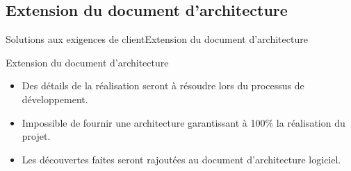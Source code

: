     \subsection{Extension du document d'architecture}
      \begin{frame}{Solutions aux exigences de client}{Extension du document d'architecture}
        \begin{block}{Extension du document d'architecture}
          \begin{itemize}
            \item<1-> Des détails de la réalisation seront à résoudre lors du processus de développement.
            \item<2-> Impossible de fournir une architecture garantissant à 100\% la réalisation du projet. 
            \item<3-> Les découvertes faites seront rajoutées au document d’architecture logiciel.
          \end{itemize}
        \end{block}
      \end{frame}
  
